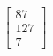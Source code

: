 \documentclass[preview]{standalone}
\begin{document}
\begin{align*}
\begin{bmatrix}87\\127\\7\end{bmatrix}
\end{align*}
\end{document}
